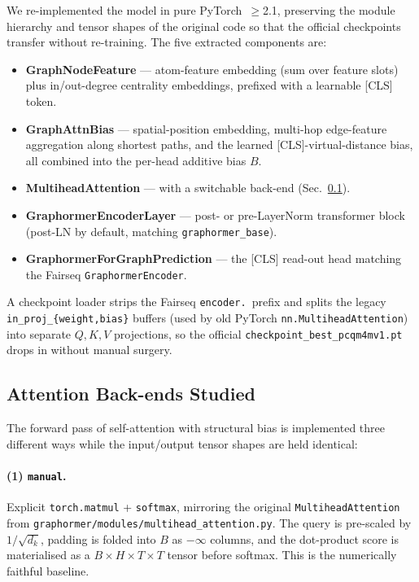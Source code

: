 \documentclass[11pt]{article}
\begin{document}
We re-implemented the model in pure PyTorch~$\ge$2.1, preserving the
module hierarchy and tensor shapes of the original code so that the
official checkpoints transfer without re-training. The five extracted
components are:
\begin{itemize}
    \item \textbf{GraphNodeFeature} --- atom-feature embedding (sum over
        feature slots) plus in/out-degree centrality embeddings, prefixed
        with a learnable [CLS] token.
    \item \textbf{GraphAttnBias} --- spatial-position embedding,
        multi-hop edge-feature aggregation along shortest paths, and
        the learned [CLS]-virtual-distance bias, all combined into the
        per-head additive bias $B$.
    \item \textbf{MultiheadAttention} --- with a switchable back-end
        (Sec.~\ref{sec:backends}).
    \item \textbf{GraphormerEncoderLayer} --- post- or
        pre-LayerNorm transformer block (post-LN by default, matching
        \texttt{graphormer\_base}).
    \item \textbf{GraphormerForGraphPrediction} --- the [CLS] read-out
        head matching the Fairseq \texttt{GraphormerEncoder}.
\end{itemize}
A checkpoint loader strips the Fairseq \texttt{encoder.}~prefix and
splits the legacy \texttt{in\_proj\_\{weight,bias\}} buffers (used by
old PyTorch \texttt{nn.MultiheadAttention}) into separate
$Q,K,V$ projections, so the official
\texttt{checkpoint\_best\_pcqm4mv1.pt} drops in without manual surgery.

\subsection{Attention Back-ends Studied}
\label{sec:backends}

The forward pass of self-attention with structural bias is implemented
three different ways while the input/output tensor shapes are held
identical:

\paragraph{(1) \texttt{manual}.} Explicit \texttt{torch.matmul} +
\texttt{softmax}, mirroring the original \texttt{MultiheadAttention} from
\texttt{graphormer/modules/multihead\_attention.py}. The query is
pre-scaled by $1/\sqrt{d_k}$, padding is folded into $B$ as $-\infty$
columns, and the dot-product score is materialised as a
$B{\times}H{\times}T{\times}T$ tensor before softmax. This is the
numerically faithful baseline.
\end{document}
